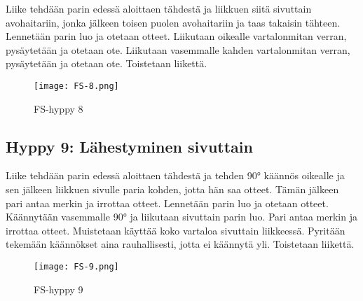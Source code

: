 Liike tehdään parin edessä aloittaen tähdestä ja liikkuen siitä sivuttain avohaitariin, jonka jälkeen toisen puolen avohaitariin ja taas takaisin tähteen. Lennetään parin luo ja otetaan otteet. Liikutaan oikealle vartalonmitan verran, pysäytetään ja otetaan ote. Liikutaan vasemmalle kahden vartalonmitan verran, pysäytetään ja otetaan ote. Toistetaan liikettä. 


\begin{figure*}[]\centering\texttt{[image: FS-8.png]}\caption{FS-hyppy 8}\end{figure*} 

\subsection{ Hyppy 9: Lähestyminen sivuttain }
\label{fs-kuviohyppaaminen-hyppy-9-lahestyminen-sivuttain}


Liike tehdään parin edessä aloittaen tähdestä ja tehden 90° käännös oikealle ja sen jälkeen liikkuen sivulle paria kohden, jotta hän saa otteet. Tämän jälkeen pari antaa merkin ja irrottaa otteet. Lennetään parin luo ja otetaan otteet. Käännytään vasemmalle 90° ja liikutaan sivuttain parin luo. Pari antaa merkin ja irrottaa otteet. Muistetaan käyttää koko vartaloa sivuttain liikkeessä. Pyritään tekemään käännökset aina rauhallisesti, jotta ei käännytä yli. Toistetaan liikettä. 


\begin{figure*}[]\centering\texttt{[image: FS-9.png]}\caption{FS-hyppy 9}\end{figure*} 

